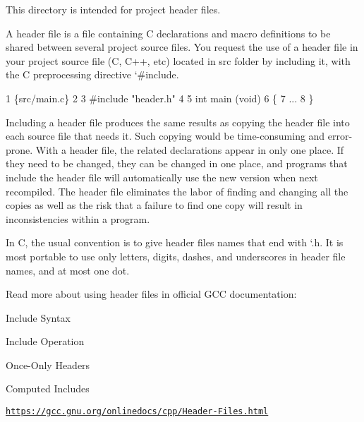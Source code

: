 This directory is intended for project header files.

A header file is a file containing C declarations and macro definitions to be shared between several project source files. You request the use of a header file in your project source file (C, C++, etc) located in {\ttfamily src} folder by including it, with the C preprocessing directive `\#include\textquotesingle{}.


\begin{DoxyCode}
1 \{src/main.c\}
2 
3 #include "header.h"
4 
5 int main (void)
6 \{
7  ...
8 \}
\end{DoxyCode}


Including a header file produces the same results as copying the header file into each source file that needs it. Such copying would be time-\/consuming and error-\/prone. With a header file, the related declarations appear in only one place. If they need to be changed, they can be changed in one place, and programs that include the header file will automatically use the new version when next recompiled. The header file eliminates the labor of finding and changing all the copies as well as the risk that a failure to find one copy will result in inconsistencies within a program.

In C, the usual convention is to give header files names that end with `.h\textquotesingle{}. It is most portable to use only letters, digits, dashes, and underscores in header file names, and at most one dot.

Read more about using header files in official G\+CC documentation\+:


\begin{DoxyItemize}
\item Include Syntax
\item Include Operation
\item Once-\/\+Only Headers
\item Computed Includes
\end{DoxyItemize}

\href{https://gcc.gnu.org/onlinedocs/cpp/Header-Files.html}{\tt https\+://gcc.\+gnu.\+org/onlinedocs/cpp/\+Header-\/\+Files.\+html} 
